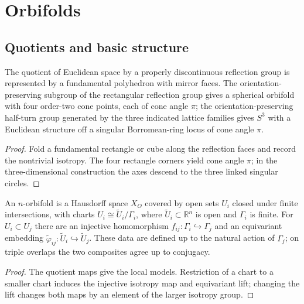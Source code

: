 \chapter{Orbifolds}

\section{Quotients and basic structure}

\begin{example}
\label{thurston-ch13-reflection-quotient}

The quotient of Euclidean space by a properly discontinuous reflection group is
represented by a fundamental polyhedron with mirror faces.  The orientation-
preserving subgroup of the rectangular reflection group gives a spherical
orbifold with four order-two cone points, each of cone angle $\pi$; the
orientation-preserving half-turn group generated by the three indicated lattice
families gives $S^3$ with a Euclidean structure off a singular Borromean-ring
locus of cone angle $\pi$.
\end{example}
\begin{proof}
\sketch Fold a fundamental rectangle or cube along the reflection faces and
record the nontrivial isotropy.  The four rectangle corners yield cone angle
$\pi$; in the three-dimensional construction the axes descend to the three
linked singular circles.
\end{proof}

\begin{definition}
\label{thurston-ch13-orbifold-atlas}

An $n$-orbifold is a Hausdorff space $X_O$ covered by open sets $U_i$ closed
under finite intersections, with charts
$U_i\cong\widetilde U_i/\Gamma_i$, where $\widetilde U_i\subset\mathbb R^n$
is open and $\Gamma_i$ is finite.  For $U_i\subset U_j$ there are an injective
homomorphism $f_{ij}:\Gamma_i\hookrightarrow\Gamma_j$ and an equivariant
embedding $\widetilde\varphi_{ij}:\widetilde U_i\hookrightarrow\widetilde U_j$.
These data are defined up to the natural action of $\Gamma_j$; on triple
overlaps the two composites agree up to conjugacy.
\end{definition}
\begin{proof}
\sketch The quotient maps give the local models.  Restriction of a chart to a
smaller chart induces the injective isotropy map and equivariant lift; changing
the lift changes both maps by an element of the larger isotropy group.
\end{proof}

